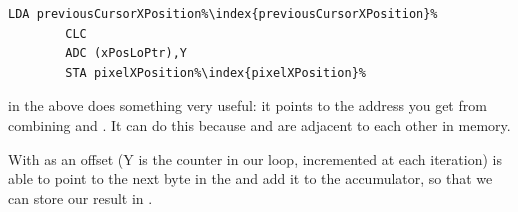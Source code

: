 \begin{lstlisting}[basicstyle=\ttfamily\scriptsize,escapechar=\%]
        LDA previousCursorXPosition%\index{previousCursorXPosition}%
        CLC 
        ADC (xPosLoPtr),Y
        STA pixelXPosition%\index{pixelXPosition}%
\end{lstlisting}

 in the above does something very useful: it points to the address you get from combining
  and  . It can do this because 
and  are adjacent to each other in memory.

With  as an offset  (Y is the counter in our loop,
incremented at each iteration)  is able to point to the next byte in the  and add it to
the accumulator, so that we can store our result in .
 
